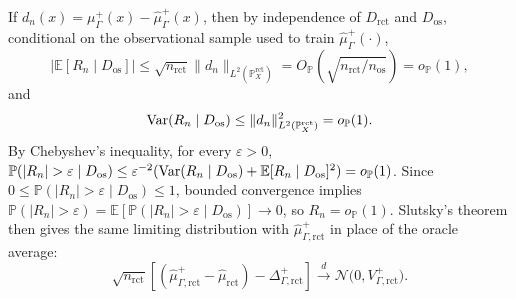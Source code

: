If \(d_n(x)=\mu^+_{\Gamma}(x)-\widehat{\mu}^+_{\Gamma}(x)\), then by independence of \(D_{\mathrm{rct}}\) and \(D_{\mathrm{os}}\), conditional on the observational sample used to train \(\widehat{\mu}^+_{\Gamma}(\cdot)\),
\[
  |\mathbb{E}[R_n\mid D_{\mathrm{os}}]|
  \leq
  \sqrt{n_{\mathrm{rct}}}\|d_n\|_{L^2(\mathbb{P}^{\mathrm{rct}}_X)}
  =
  O_{\mathbb{P}}\!\left(\sqrt{n_{\mathrm{rct}}/n_{\mathrm{os}}}\right)
  =
  o_{\mathbb{P}}(1),
\]
and
\[
  \operatorname{Var}(R_n\mid D_{\mathrm{os}})
  \leq
  \|d_n\|^2_{L^2(\mathbb{P}^{\mathrm{rct}}_X)}
  =
  o_{\mathbb{P}}(1).
\]
By Chebyshev's inequality, for every \(\varepsilon>0\), \(\mathbb{P}(|R_n|>\varepsilon\mid D_{\mathrm{os}}) \leq \varepsilon^{-2}(\Var(R_n\mid D_{\mathrm{os}}) + \mathbb{E}[R_n\mid D_{\mathrm{os}}]^2) = o_{\mathbb{P}}(1)\). Since \(0\leq\mathbb{P}(|R_n|>\varepsilon\mid D_{\mathrm{os}})\leq 1\), bounded convergence implies \(\mathbb{P}(|R_n|>\varepsilon)=\mathbb{E}[\mathbb{P}(|R_n|>\varepsilon\mid D_{\mathrm{os}})]\to 0\), so \(R_n=o_{\mathbb{P}}(1)\). Slutsky's theorem then gives the same limiting distribution with \(\widehat{\mu}^+_{\Gamma,\mathrm{rct}}\) in place of the oracle average:
\[
  \sqrt{n_{\mathrm{rct}}}
  \left[
    \left(
      \widehat{\mu}^+_{\Gamma,\mathrm{rct}}
      -
      \widehat{\mu}_{\mathrm{rct}}
    \right)
    -
    \Delta^+_{\Gamma,\mathrm{rct}}
  \right]
  \xrightarrow{d}
  \mathcal{N}\bigl(0,V^+_{\Gamma,\mathrm{rct}}\bigr).
\]

